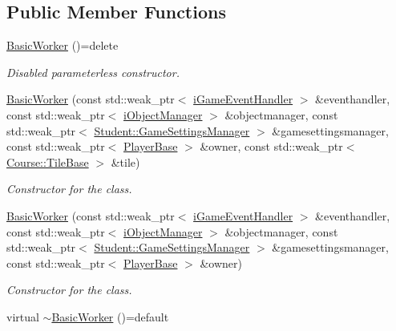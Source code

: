 \subsection*{Public Member Functions}
\begin{DoxyCompactItemize}
\item 
\hypertarget{class_course_1_1_basic_worker_a066d86fca7e3f10e9ff2bd9f0a2167ff}{\hyperlink{class_course_1_1_basic_worker_a066d86fca7e3f10e9ff2bd9f0a2167ff}{Basic\-Worker} ()=delete}\label{class_course_1_1_basic_worker_a066d86fca7e3f10e9ff2bd9f0a2167ff}

\begin{DoxyCompactList}\small\item\em Disabled parameterless constructor. \end{DoxyCompactList}\item 
\hyperlink{class_course_1_1_basic_worker_aec09b8ef7b8bc7a9159c5fe870b058c5}{Basic\-Worker} (const std\-::weak\-\_\-ptr$<$ \hyperlink{class_course_1_1i_game_event_handler}{i\-Game\-Event\-Handler} $>$ \&eventhandler, const std\-::weak\-\_\-ptr$<$ \hyperlink{class_course_1_1i_object_manager}{i\-Object\-Manager} $>$ \&objectmanager, const std\-::weak\-\_\-ptr$<$ \hyperlink{class_student_1_1_game_settings_manager}{Student\-::\-Game\-Settings\-Manager} $>$ \&gamesettingsmanager, const std\-::weak\-\_\-ptr$<$ \hyperlink{class_course_1_1_player_base}{Player\-Base} $>$ \&owner, const std\-::weak\-\_\-ptr$<$ \hyperlink{class_course_1_1_tile_base}{Course\-::\-Tile\-Base} $>$ \&tile)
\begin{DoxyCompactList}\small\item\em Constructor for the class. \end{DoxyCompactList}\item 
\hyperlink{class_course_1_1_basic_worker_a465f7c5e534a262704a24b18eb0a4bfc}{Basic\-Worker} (const std\-::weak\-\_\-ptr$<$ \hyperlink{class_course_1_1i_game_event_handler}{i\-Game\-Event\-Handler} $>$ \&eventhandler, const std\-::weak\-\_\-ptr$<$ \hyperlink{class_course_1_1i_object_manager}{i\-Object\-Manager} $>$ \&objectmanager, const std\-::weak\-\_\-ptr$<$ \hyperlink{class_student_1_1_game_settings_manager}{Student\-::\-Game\-Settings\-Manager} $>$ \&gamesettingsmanager, const std\-::weak\-\_\-ptr$<$ \hyperlink{class_course_1_1_player_base}{Player\-Base} $>$ \&owner)
\begin{DoxyCompactList}\small\item\em Constructor for the class. \end{DoxyCompactList}\item 
\hypertarget{class_course_1_1_basic_worker_a4738d8d4a6c88054355bdd972e1b7aad}{virtual \hyperlink{class_course_1_1_basic_worker_a4738d8d4a6c88054355bdd972e1b7aad}{$\sim$\-Basic\-Worker} ()=default}\label{class_course_1_1_basic_worker_a4738d8d4a6c88054355bdd972e1b7aad}


\end{DoxyCompactItemize}
